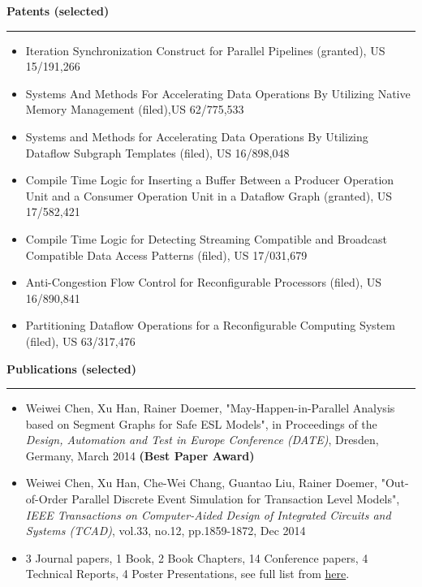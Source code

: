 \documentclass[10pt,A4]{article}
\newcommand{\cvsection}[1]
{
	\begin{flushleft}
  \LARGE\textcolor{sectcol}{\textbf{  #1}}
	\end{flushleft}
  \vspace{-15pt}
  \textcolor{softcol}{\hrule}
  \vspace{8pt}
}
\begin{document}
\cvsection{Patents (selected)}
\vspace{-4pt}
\begin{itemize}
 \setlength\itemsep{-0.1cm}
 \item Iteration Synchronization Construct for Parallel Pipelines (granted), \textcolor{bgcol}{US 15/191,266}
 \item Systems And Methods For Accelerating Data Operations By Utilizing Native Memory Management (filed),\textcolor{bgcol}{US 62/775,533}
 \item Systems and Methods for Accelerating Data Operations By Utilizing Dataflow Subgraph Templates (filed), \textcolor{bgcol}{US 16/898,048}
 \item Compile Time Logic for Inserting a Buffer Between a Producer Operation Unit and a Consumer Operation Unit in a Dataflow Graph (granted), \textcolor{bgcol}{US 17/582,421}
 \item Compile Time Logic for Detecting Streaming Compatible and Broadcast Compatible Data Access Patterns (filed), \textcolor{bgcol}{US 17/031,679}
 \item Anti-Congestion Flow Control for Reconfigurable Processors (filed), \textcolor{bgcol}{US 16/890,841}
 \item Partitioning Dataflow Operations for a Reconfigurable Computing System (filed), \textcolor{bgcol}{US 63/317,476}
\end{itemize}

\cvsection{Publications (selected)}
\vspace{-4pt}
\begin{itemize}
 \setlength\itemsep{-0.1cm}
\item Weiwei Chen, Xu Han, Rainer Doemer, \textcolor{bgcol}{"May-Happen-in-Parallel Analysis based on Segment Graphs for Safe ESL Models"},
  in Proceedings of the \emph{Design, Automation and Test in Europe Conference (DATE)}, Dresden, Germany, March 2014 \textbf{(Best Paper Award)}
 \item Weiwei Chen, Xu Han, Che-Wei Chang, Guantao Liu, Rainer Doemer, \textcolor{bgcol}{"Out-of-Order Parallel Discrete Event Simulation for Transaction Level Models"},
  \emph{IEEE Transactions on Computer-Aided Design of Integrated Circuits and Systems (TCAD)}, vol.33, no.12, pp.1859-1872, Dec 2014
 \item 3 Journal papers, 1 Book, 2 Book Chapters, 14 Conference papers, 4 Technical Reports, 4 Poster Presentations,
  see full list from \href{http://www.cecs.uci.edu/~weiweic/pubs\_by\_type.html}{here}.
\end{itemize}
\end{document}
